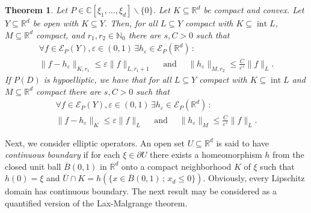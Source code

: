 \documentclass[12pt]{amsart}
\newcommand{\N}{\mathbb{N}}
\newcommand{\R}{\mathbb{R}}
\newcommand{\C}{\mathbb{C}}
\newtheorem{theorem}{Theorem}[section]
\theoremstyle{definition}
\theoremstyle{remark}
\numberwithin{equation}{section}
\begin{document}
\begin{theorem}\label{theo: quantitative convex}
Let $P\in \C[\xi_1,\ldots,\xi_d] \backslash \{0\}$. Let $K \subseteq \R^d$ be compact and convex. Let $Y\subseteq\R^d$ be open with $K \subseteq Y$. Then, for all $L \subseteq Y$ compact with $K \subseteq \operatorname{int} L$,  $M \subseteq \R^d$ compact, and $r_1,r_2 \in \N_0$ there are $s, C>0$ such that 
		\begin{gather*} 
		\forall f\in\mathscr{E}_P(Y), \varepsilon\in (0,1) \,\exists h_\varepsilon \in\mathscr{E}_P(\R^d) \, :\\ \nonumber
		\|f-h_\varepsilon\|_{K,r_1}\leq \varepsilon\|f\|_{L,r_1+1} \quad \mbox{ and } \quad \|h_\varepsilon\|_{M,r_2}\leq\frac{C}{\varepsilon^s}\|f\|_{L}.
	\end{gather*}
If $P(D)$ is hypoelliptic, we have that for all $L \subseteq Y$ compact with $K \subseteq \operatorname{int} L$ and $M \subseteq \R^d$ compact there are $s, C>0$ such that 
\begin{gather*} 
	\forall f\in\mathscr{E}_P(Y), \varepsilon\in (0,1) \,\exists h_\varepsilon \in\mathscr{E}_P(\R^d) \, :\\ \nonumber
	\|f-h_\varepsilon\|_{K}\leq \varepsilon\|f\|_{L} \quad \mbox{ and } \quad \|h_\varepsilon\|_{M}\leq\frac{C}{\varepsilon^s}\|f\|_{L}.
\end{gather*}
\end{theorem}



Next, we consider elliptic operators. An open  set $U \subseteq \R^d$ is said to have  \emph{continuous boundary} if for each $\xi \in \partial U$ there exists a homeomorphism $h$ from the closed unit ball $\overline{B}(0,1)$ in $\R^d$ onto a compact neighborhood $K$ of $\xi$ such that $h(0) = \xi$  
 and  $\overline{U} \cap K= h\left(\{x\in \overline{B}(0,1)\, ; \,x_d\leq 0\}\right)$. Obviously, every Lipschitz domain has continuous boundary. The next result may be considered as a quantified version of the Lax-Malgrange theorem.
 
\end{document}
